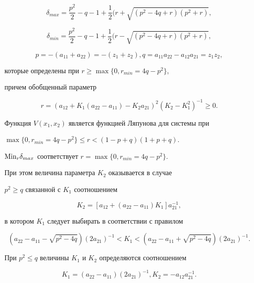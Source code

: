 $$


\delta_{max}=\frac {p^{2}}{2}-q-1+\frac {1}{2}(r+\sqrt {(p^{2}-4q+r)


(p^{2}+r)},


$$


$$


\delta_{min}=\frac {p^{2}}{2}-q-1+\frac {1}{2}(r-\sqrt {(p^{2}-4q+r)


(p^{2}+r)},


$$


$$


p=-(a_{11}+a_{22})=-(z_{1}+z_{2}),


q=a_{11}a_{22}-a_{12}a_{21}=z_{1}z_{2},


$$


которые определены при $r \ge \max \{ 0,r_{min}=4q-p^{2} \}$,


причем обобщенный параметр


$$


r=(a_{12}+K_{1}(a_{22}-a_{11})-K_{2}a_{21})^{2}(K_{2}-K_{1}^{2})^{-1}\ge 0.


$$


Функция $V(x_{1},x_{2})$ является функцией Ляпунова для системы при


$\max \{ 0,r_{min}=4q-p^{2} \} \le r<(1-p+q)(1+p+q)$.


${\rm Min}_{r}\delta_{max}$ соответствует $r=\max \{ 0,r_{min}=4q-p^{2} \} $.


При этом величина параметра $K_{2}$ оказывается в случае


$p^{2}\ge q$ связанной с $K_{1}$ соотношением


$$


K_{2}=[a_{12}+(a_{22}-a_{11})K_{1}]a_{21}^{-1},


$$


в котором $K_{1}$ следует выбирать в соответствии с правилом


$$


(a_{22}-a_{11}-\sqrt {p^{2}-4q})(2a_{21})^{-1}<K_{1}<


(a_{22}-a_{11}+\sqrt {p^{2}-4q})(2a_{21})^{-1}.


$$


При $p^{2}\le q$ величины $K_{1}$ и $K_{2}$ определяются соотношением


$$


K_{1}=(a_{22}-a_{11})(2a_{21})^{-1}, K_{2}=-a_{12}a_{21}^{-1}.


$$





